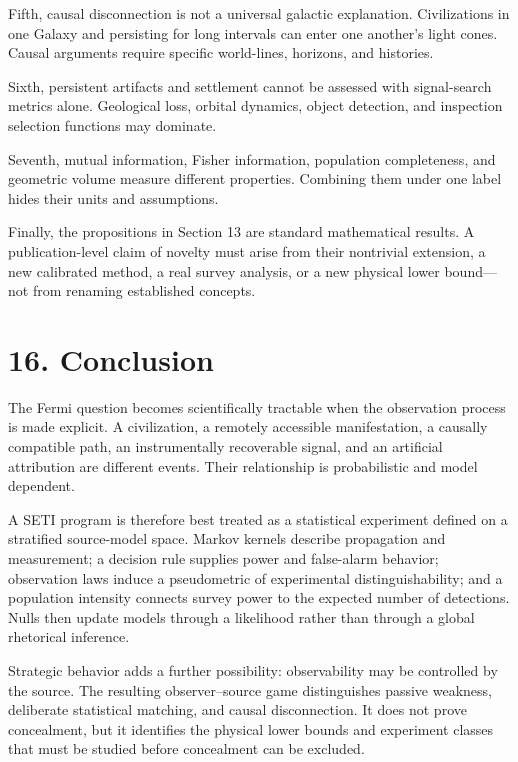 \documentclass[11pt,a4paper]{article}
\begin{document}
Fifth, causal disconnection is not a universal galactic explanation. Civilizations in one Galaxy and persisting for long intervals can enter one another's light cones. Causal arguments require specific world-lines, horizons, and histories.

Sixth, persistent artifacts and settlement cannot be assessed with signal-search metrics alone. Geological loss, orbital dynamics, object detection, and inspection selection functions may dominate.

Seventh, mutual information, Fisher information, population completeness, and geometric volume measure different properties. Combining them under one label hides their units and assumptions.

Finally, the propositions in Section 13 are standard mathematical results. A publication-level claim of novelty must arise from their nontrivial extension, a new calibrated method, a real survey analysis, or a new physical lower bound---not from renaming established concepts.

\section{16. Conclusion}\label{16-conclusion}

The Fermi question becomes scientifically tractable when the observation process is made explicit. A civilization, a remotely accessible manifestation, a causally compatible path, an instrumentally recoverable signal, and an artificial attribution are different events. Their relationship is probabilistic and model dependent.

A SETI program is therefore best treated as a statistical experiment defined on a stratified source-model space. Markov kernels describe propagation and measurement; a decision rule supplies power and false-alarm behavior; observation laws induce a pseudometric of experimental distinguishability; and a population intensity connects survey power to the expected number of detections. Nulls then update models through a likelihood rather than through a global rhetorical inference.

Strategic behavior adds a further possibility: observability may be controlled by the source. The resulting observer--source game distinguishes passive weakness, deliberate statistical matching, and causal disconnection. It does not prove concealment, but it identifies the physical lower bounds and experiment classes that must be studied before concealment can be excluded.
\end{document}

